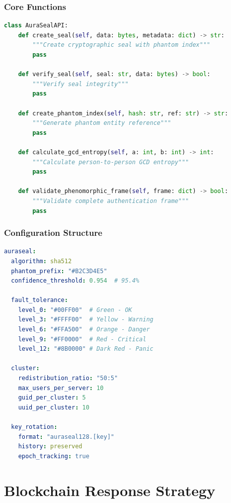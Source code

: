 \documentclass[12pt,a4paper]{report}
\theoremstyle{definition}
\begin{document}
\section{Core Functions}

\begin{lstlisting}[language=Python, caption=Core API Functions]
class AuraSealAPI:
    def create_seal(self, data: bytes, metadata: dict) -> str:
        """Create cryptographic seal with phantom index"""
        pass
    
    def verify_seal(self, seal: str, data: bytes) -> bool:
        """Verify seal integrity"""
        pass
    
    def create_phantom_index(self, hash: str, ref: str) -> str:
        """Generate phantom entity reference"""
        pass
    
    def calculate_gcd_entropy(self, a: int, b: int) -> int:
        """Calculate person-to-person GCD entropy"""
        pass
    
    def validate_phenomorphic_frame(self, frame: dict) -> bool:
        """Validate complete authentication frame"""
        pass
\end{lstlisting}

\section{Configuration Structure}

\begin{lstlisting}[language=YAML, caption=System Configuration]
auraseal:
  algorithm: sha512
  phantom_prefix: "#B2C3D4E5"
  confidence_threshold: 0.954  # 95.4%
  
  fault_tolerance:
    level_0: "#00FF00"  # Green - OK
    level_3: "#FFFF00"  # Yellow - Warning
    level_6: "#FFA500"  # Orange - Danger
    level_9: "#FF0000"  # Red - Critical
    level_12: "#8B0000" # Dark Red - Panic
    
  cluster:
    redistribution_ratio: "50:5"
    max_users_per_server: 10
    guid_per_cluster: 5
    uuid_per_cluster: 10
    
  key_rotation:
    format: "auraseal128.[key]"
    history: preserved
    epoch_tracking: true
\end{lstlisting}


\part{Blockchain Response Strategy}
\end{document}
